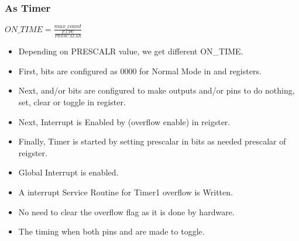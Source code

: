 \subsubsection{As Timer}
\begin{center}
    $ON\_TIME = \frac{max\_count}{\frac{F\_CPU}{PRESCALAR}}$
\end{center}
\begin{itemize}
    \item Depending on PRESCALR value, we get different ON\_TIME.
    \item First,  bits are configured as 0000 for Normal Mode in  and  registers.
    \item Next,  and/or  bits are configured to make outputs  and/or  pins to do nothing, set, clear or toggle in  register.
    \item Next, Interrupt is Enabled by  (overflow enable) in  reigster.
    \item Finally, Timer is started by setting prescalar in  bits as needed prescalar of  reigster.
    \item Global Interrupt is enabled.
    \item A interrupt Service Routine for Timer1 overflow is Written.
    \item No need to clear the overflow flag as it is done by hardware.
    \item The timing when both pins  and  are made to toggle.
\end{itemize}

